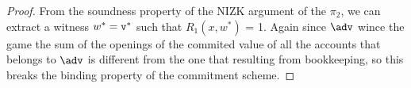 \begin{proof}
    From the soundness property of the NIZK argument of the $\pi_2$, we can extract a witness $w^* = \texttt{v}^*$ such that $R_1(x, w^*)$ = 1. Again since $\adv$ wince the game the sum of the openings of the commited value of all the accounts that belongs to $\adv$ is different from the one that resulting from bookkeeping, so this breaks the binding property of the commitment scheme.


    
\end{proof}